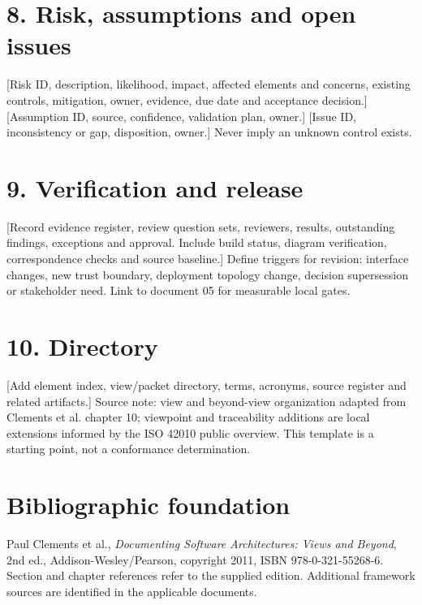 \documentclass[11pt,letterpaper]{article}
\begin{document}
\section*{8. Risk, assumptions and open issues}
[Risk ID, description, likelihood, impact, affected elements and concerns, existing controls, mitigation, owner, evidence, due date and acceptance decision.] [Assumption ID, source, confidence, validation plan, owner.] [Issue ID, inconsistency or gap, disposition, owner.] Never imply an unknown control exists.\par\smallskip
\section*{9. Verification and release}
[Record evidence register, review question sets, reviewers, results, outstanding findings, exceptions and approval. Include build status, diagram verification, correspondence checks and source baseline.] Define triggers for revision: interface changes, new trust boundary, deployment topology change, decision supersession or stakeholder need. Link to document 05 for measurable local gates.\par\smallskip
\section*{10. Directory}
[Add element index, view/packet directory, terms, acronyms, source register and related artifacts.] Source note: view and beyond-view organization adapted from Clements et al. chapter 10; viewpoint and traceability additions are local extensions informed by the ISO 42010 public overview. This template is a starting point, not a conformance determination.\par\smallskip
\section*{Bibliographic foundation}
Paul Clements et al., \emph{Documenting Software Architectures: Views and Beyond}, 2nd ed., Addison-Wesley/Pearson, copyright 2011, ISBN 978-0-321-55268-6. Section and chapter references refer to the supplied edition. Additional framework sources are identified in the applicable documents.\par
\end{document}
